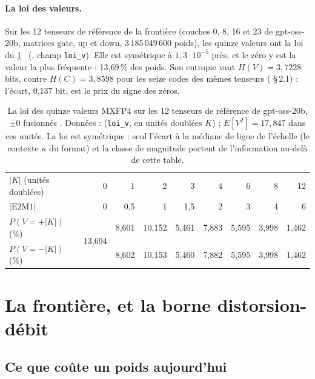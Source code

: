 \paragraph{La loi des valeurs.} Sur les 12 tenseurs de référence de la frontière (couches 0, 8, 16 et 23 de gpt-oss-20b, matrices gate, up et down, 3\,185\,049\,600 poids), les quinze valeurs ont la loi du \cref{t3que:tab:loi} \mes~(, champ \texttt{loi\_v}). Elle est symétrique à $1{,}3\cdot 10^{-5}$ près, et le zéro y est la valeur la plus fréquente : 13,69\,\% des poids. Son entropie vaut $H(V) = 3{,}7228$ bits, contre $H(C) = 3{,}8598$ pour les seize codes des mêmes tenseurs ( §\,2.1) : l'écart, 0,137 bit, est le prix du signe des zéros.

\begin{table}[tbp]
\centering\small
\begin{tabular}{l *{8}{r}}
\toprule
$|K|$ (unités doublées) & 0 & 1 & 2 & 3 & 4 & 6 & 8 & 12 \\
$|\mathrm{E2M1}|$ & 0 & 0,5 & 1 & 1,5 & 2 & 3 & 4 & 6 \\
\midrule
$P(V = +|K|)$ (\%) & \multirow{2}{*}{13,694} & 8,601 & 10,152 & 5,461 & 7,883 & 5,595 & 3,998 & 1,462 \\
$P(V = -|K|)$ (\%) & & 8,602 & 10,153 & 5,460 & 7,882 & 5,595 & 3,998 & 1,462 \\
\bottomrule
\end{tabular}
\caption[La loi des quinze valeurs MXFP4]{La loi des quinze valeurs MXFP4 sur les 12 tenseurs de référence de gpt-oss-20b, $\pm0$ fusionnés \mes. Données :  (\texttt{loi\_v}, en unités doublées $K$) ; $E[V^2] = 17{,}847$ dans ces unités. La loi est symétrique : seul l'écart à la médiane de ligne de l'échelle (le contexte $\kappa$ du format) et la classe de magnitude portent de l'information au-delà de cette table.}
\label{t3que:tab:loi}
\end{table}

\section{La frontière, et la borne distorsion-débit}\label{t3que:sec:frontiere}

\subsection{Ce que coûte un poids aujourd'hui}

